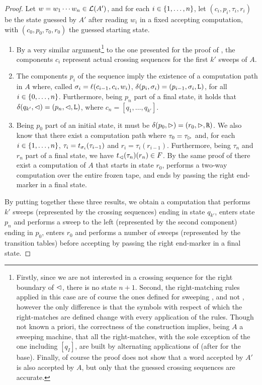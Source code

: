 \begin{proof}
	Let $w=w_1\cdots w_n\in\mathcal L(A')$, and for each $i\in\{1,\dots,n\}$, let $(c_i,p_i,\tau_i,r_i)$ be the state guessed by $A'$ after reading $w_i$ in a fixed accepting computation, with $(c_0,p_0,\tau_0,r_0)$ the guessed starting state.
	\begin{enumerate}
		\item By a very similar argument\footnote{%
			      Firstly, since we are not interested in a crossing sequence for the right boundary of $\lhd$, there is no state $n+1$.
			      Second, the right-matching rules applied in this case are of course the ones defined for sweeping \kDLAs, and not \TDFAs, however the only difference is that the symbols with respect of which the right-matches are defined change with every application of the rules.
			      Though not known a priori, the correctness of the construction implies, being $A$ a sweeping machine, that all the right-matches, with the sole exception of the one including $[q_I]$, are built by alternating applications of  (after  for the base).
			      Finally, of course the proof does not show that a word accepted by $A'$ is also accepted by $A$, but only that the guessed crossing sequences are accurate.}
		      to the one presented for the proof of , the components $c_i$ represent actual crossing sequences for the first $k'$ sweeps of $A$.
		\item The components $p_i$ of the sequence imply the existence of a computation path in $A$ where, called $\sigma_i=\ell(c_{i-1},c_i,w_i)$, $\delta(p_i,\sigma_i)=(p_{i-1},\sigma_i,\mathtt L)$, for all $i\in\{0,\dots,n\}$.
		      Furthermore, being $p_n$ part of a final state, it holds that $\delta(q_{k'},\lhd)=(p_n,\lhd,\mathtt L)$, where $c_n=[q_1,\dots,q_{k'}]$.
		\item Being $p_0$ part of an initial state, it must be $\delta(p_0,\rhd)=(r_0,\rhd,\mathtt R)$.
		      We also know that there exist a computation path where $\tau_0=\tau_\rhd$ and, for each $i\in\{1,\dots,n\}$, $\tau_i=t_{\sigma_i}(\tau_{i-1})$ and $r_i=\tau_i(r_{i-1})$.
		      Furthermore, being $\tau_n$ and $r_n$ part of a final state, we have $t_\lhd(\tau_n)(r_n)\in F$.
		      By the same proof of  there exist a computation of $A$ that starts in state $r_0$, performs a two-way computation over the entire frozen tape, and ends by passing the right end-marker in a final state.
	\end{enumerate}
	By putting together these three results, we obtain a computation that performs $k'$ sweeps (represented by the crossing sequences) ending in state $q_{k'}$, enters state $p_n$ and performs a sweep to the left (represented by the second component) ending in $p_0$, enters $r_0$ and performs a number of sweeps (represented by the transition tables) before accepting by passing the right end-marker in a final state.
\end{proof}

